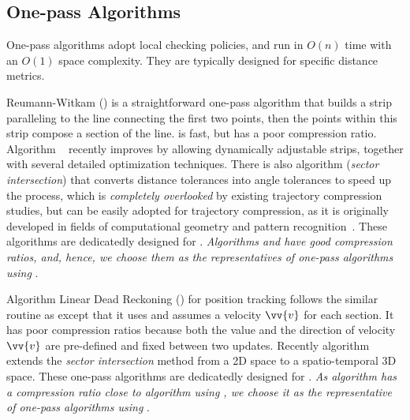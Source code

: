 \subsection{One-pass Algorithms}

One-pass algorithms adopt local checking policies, and run in $O(n)$ time with an $O(1)$ space complexity. They are typically designed for specific distance metrics.

Reumann-Witkam (\rwa) \cite{Reumann:Strip} is a straightforward one-pass algorithm that builds a strip paralleling to the line connecting the first two points, then the points within this strip compose a section of the line.  \rwa is fast, but has a poor compression ratio.
Algorithm \operb~\cite{Lin:Operb} recently improves \rwa  by allowing dynamically adjustable strips, together with several detailed optimization techniques.
%
There is also algorithm \siped (\emph{sector intersection}) that converts \ped distance tolerances into angle tolerances to speed up the process, which is {\em completely overlooked} by existing trajectory compression studies,  but can be easily adopted for trajectory compression, as it is originally developed in fields of computational geometry and pattern recognition~\cite{Williams:Longest,Sklansky:Cone,Dunham:Cone, Zhao:Sleeve}.
%
These algorithms are dedicatedly designed  for \ped. {\em Algorithms \operb and \siped have good compression ratios, and, hence, we choose them as the representatives of  one-pass algorithms using \ped}.


Algorithm Linear Dead Reckoning (\ldr) for position tracking \cite{Trajcevski:DDR} follows the similar routine as \rwa except that it uses \sed and assumes a velocity ${\vv{v}}$ for each section.
It has poor compression ratios because both the value and the direction of velocity ${\vv{v}}$ are pre-defined and fixed between two updates.
Recently algorithm \cised~\cite{Lin:Cised} extends the \textit{sector intersection} method \siped from a 2D space to a spatio-temporal 3D space.
These one-pass algorithms are dedicatedly designed for \sed. {\em As algorithm \cised has a compression ratio close to algorithm \dpa using \sed, we choose it as the representative of one-pass algorithms using \sed}.


